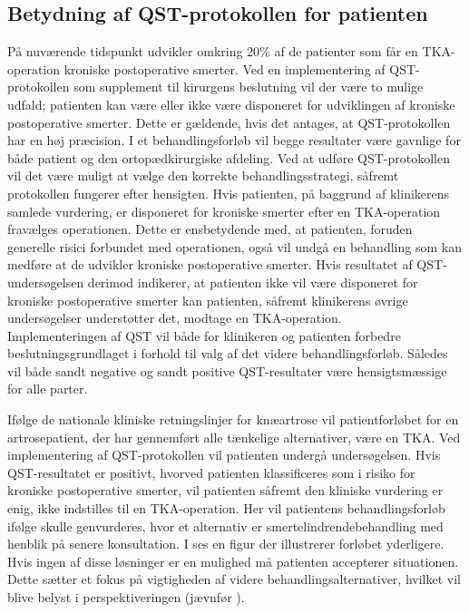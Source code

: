 \subsection{Betydning af QST-protokollen for patienten}
På nuværende tidspunkt udvikler omkring 20\% af de patienter som får en TKA-operation kroniske postoperative smerter. Ved en implementering af QST-protokollen som supplement til kirurgens beslutning vil der være to mulige udfald; patienten kan være eller ikke være disponeret for udviklingen af kroniske postoperative smerter. Dette er gældende, hvis det antages, at QST-protokollen har en høj præcision. I et behandlingsforløb vil begge resultater være gavnlige for både patient og den ortopædkirurgiske afdeling. Ved at udføre QST-protokollen vil det være muligt at vælge den korrekte behandlingsstrategi, såfremt protokollen fungerer efter hensigten. Hvis patienten, på baggrund af klinikerens samlede vurdering, er disponeret for kroniske smerter efter en TKA-operation fravælges operationen. Dette er ensbetydende med, at patienten, foruden generelle risici forbundet med operationen, også vil undgå en behandling som kan medføre at de udvikler kroniske postoperative smerter. Hvis resultatet af QST-undersøgelsen derimod indikerer, at patienten ikke vil være disponeret for kroniske postoperative smerter kan patienten, såfremt klinikerens øvrige undersøgelser understøtter det, modtage en TKA-operation. \\
Implementeringen af QST vil både for klinikeren og patienten forbedre beslutningsgrundlaget i forhold til valg af det videre behandlingsforløb. Således vil både sandt negative og sandt positive QST-resultater være hensigtsmæssige for alle parter.

Ifølge de nationale kliniske retningslinjer for knæartrose vil patientforløbet for en artrosepatient, der har gennemført alle tænkelige alternativer, være en TKA. \citep{brostrom2012} Ved implementering af QST-protokollen vil patienten undergå undersøgelsen. Hvis QST-resultatet er positivt, hvorved patienten klassificeres som i risiko for kroniske postoperative smerter, vil patienten såfremt den kliniske vurdering er enig, ikke indstilles til en TKA-operation. Her vil patientens behandlingsforløb ifølge  skulle genvurderes, hvor et alternativ er smertelindrendebehandling med henblik på senere konsultation. I  ses en figur der illustrerer forløbet yderligere. Hvis ingen af disse løsninger er en mulighed må patienten accepterer situationen. Dette sætter et fokus på vigtigheden af videre behandlingsalternativer, hvilket vil blive belyst i perspektiveringen (jævnfør ). 

